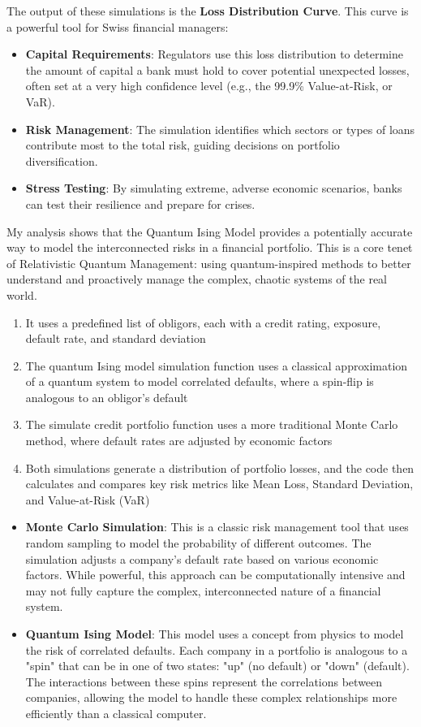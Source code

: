 \documentclass{article}
\begin{document}
The output of these simulations is the \textbf{Loss Distribution Curve}. This curve is a powerful tool for Swiss financial managers:

\begin{itemize}
    \item \textbf{Capital Requirements}: Regulators use this loss distribution to determine the amount of capital a bank must hold to cover potential unexpected losses, often set at a very high confidence level (e.g., the 99.9\% Value-at-Risk, or VaR).
    \item \textbf{Risk Management}: The simulation identifies which sectors or types of loans contribute most to the total risk, guiding decisions on portfolio diversification.
    \item \textbf{Stress Testing}: By simulating extreme, adverse economic scenarios, banks can test their resilience and prepare for crises.
\end{itemize}


My analysis shows that the Quantum Ising Model provides a potentially accurate way to model the interconnected risks in a financial portfolio. This is a core tenet of Relativistic Quantum Management: using quantum-inspired methods to better understand and proactively manage the complex, chaotic systems of the real world.
\begin{enumerate}
    \item It uses a predefined list of obligors, each with a credit rating, exposure, default rate, and standard deviation
    \item The quantum Ising model simulation function uses a classical approximation of a quantum system to model correlated defaults, where a spin-flip is analogous to an obligor's default
    \item The simulate credit portfolio function uses a more traditional Monte Carlo method, where default rates are adjusted by economic factors
    \item Both simulations generate a distribution of portfolio losses, and the code then calculates and compares key risk metrics like Mean Loss, Standard Deviation, and Value-at-Risk (VaR)
\end{enumerate}
\begin{itemize}
\item \textbf{Monte Carlo Simulation}: This is a classic risk management tool that uses random sampling to model the probability of different outcomes. The simulation adjusts a company's default rate based on various economic factors. While powerful, this approach can be computationally intensive and may not fully capture the complex, interconnected nature of a financial system.
\item \textbf{Quantum Ising Model}: This model uses a concept from physics to model the risk of correlated defaults. Each company in a portfolio is analogous to a "spin" that can be in one of two states: "up" (no default) or "down" (default). The interactions between these spins represent the correlations between companies, allowing the model to handle these complex relationships more efficiently than a classical computer.
\end{itemize}
\end{document}
